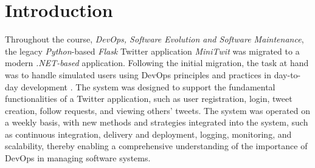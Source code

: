 \chapter{Introduction}

Throughout the course, \textit{DevOps, Software Evolution and Software Maintenance}, the legacy \textit{Python}-based \textit{Flask} Twitter application \textit{MiniTwit} was migrated to a modern \textit{.NET-based} application. Following the initial migration, the task at hand was to handle simulated users using DevOps principles and practices in day-to-day development \cite{kim2016devops}. The system was designed to support the fundamental functionalities of a Twitter application, such as user registration, login, tweet creation, follow requests, and viewing others' tweets. The system was operated on a weekly basis, with new methods and strategies integrated into the system, such as continuous integration, delivery and deployment, logging, monitoring, and scalability, thereby enabling a comprehensive understanding of the importance of DevOps in managing software systems.